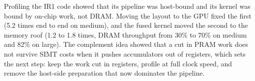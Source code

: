\documentclass[sigconf,nonacm]{acmart}
\begin{document}
Profiling the IR1 code showed that its pipeline was host-bound and its kernel was bound by on-chip work,
not DRAM. Moving the layout to the GPU fixed the first (5.2 times end to end on medium), and the fused kernel moved the second to the memory roof (1.2 to 1.8 times, DRAM throughput from 30\% to 70\% on medium and 82\% on large). The complement idea showed that a cut in PRAM work does not survive SIMT costs when it pushes
accumulators out of registers, which sets the next step: keep the work cut in registers, profile at full clock speed, and remove the host-side preparation that now dominates the pipeline.



\end{document}
